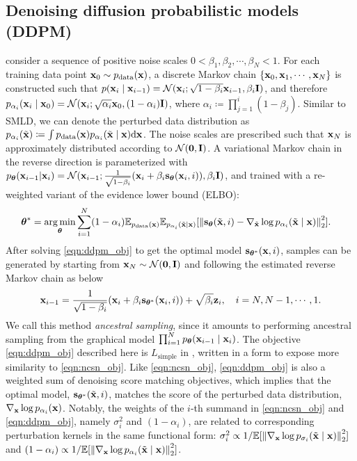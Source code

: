 \subsection{Denoising diffusion probabilistic models (DDPM)}\label{sec:ddpm}
\citet{sohl2015deep,ho2020denoising} consider a sequence of positive noise scales $0 < \beta_1, \beta_2, \cdots, \beta_N < 1$. For each training data point $\mathbf{x}_0 \sim p_{\mathrm{data}}(\mathbf{x})$, a discrete Markov chain $\{ \mathbf{x}_0, \mathbf{x}_1, \cdots, \mathbf{x}_N \}$ is constructed such that $p(\mathbf{x}_{i} \mid \mathbf{x}_{i-1}) = \mathcal{N}(\mathbf{x}_{i} ; \sqrt{1-\beta_i} \mathbf{x}_{i-1}, \beta_i \mathbf{I})$, and therefore $p_{\alpha_i}(\mathbf{x}_i \mid \mathbf{x}_0) = \mathcal{N}(\mathbf{x}_i ;\sqrt{\alpha_i} \mathbf{x}_0, (1-\alpha_i)\mathbf{I})$, where $\alpha_i \coloneqq \prod_{j=1}^i (1-\beta_j)$. Similar to SMLD, we can denote the perturbed data distribution as $p_{\alpha_i}(\tilde{\mathbf{x}}) \coloneqq \int p_\text{data}(\mathbf{x}) p_{\alpha_i}(\tilde{\mathbf{x}} \mid \mathbf{x}) \mathrm{d} \mathbf{x}$. The noise scales are prescribed such that %
$\mathbf{x}_N$ is approximately distributed according to $\mathcal{N}(\mathbf{0}, \mathbf{I})$. A variational Markov chain in the reverse direction is parameterized with $p_{\boldsymbol{\theta}}(\mathbf{x}_{i-1} | \mathbf{x}_{i}) = \mathcal{N}(\mathbf{x}_{i-1}; \frac{1}{\sqrt{1-\beta_i}} (\mathbf{x}_i + \beta_i \mathbf{s}_{\boldsymbol{\theta}}(\mathbf{x}_i, i)), \beta_i \mathbf{I})$, and trained with a re-weighted variant of the evidence lower bound (ELBO):
\begin{align}
{\boldsymbol{\theta}}^* &= \operatorname*{arg\,min}_{\boldsymbol{\theta}}
    \sum_{i=1}^{N} (1-\alpha_i) \mathbb{E}_{p_{\mathrm{data}}(\mathbf{x})}\mathbb{E}_{p_{\alpha_i}(\tilde{\mathbf{x}} \mid \mathbf{x})}[\left\lVert \mathbf{s}_{\boldsymbol{\theta}}(\tilde{\mathbf{x}}, i) - \nabla_{\tilde{\mathbf{x}}} \log p_{\alpha_i}(\tilde{\mathbf{x}} \mid \mathbf{x})\right\rVert_2^2]. \label{eqn:ddpm_obj}
\end{align}
After solving \cref{eqn:ddpm_obj} to get the optimal model $\mathbf{s}_{{\boldsymbol{\theta}}^*}(\mathbf{x}, i)$, samples can be generated by starting from $\mathbf{x}_N \sim \mathcal{N}(\mathbf{0}, \mathbf{I})$ and following the estimated reverse Markov chain as below
\begin{align}
    \mathbf{x}_{i-1} = \frac{1}{\sqrt{1-\beta_i}} (\mathbf{x}_i + \beta_i \mathbf{s}_{{\boldsymbol{\theta}}^*}(\mathbf{x}_i, i)) + \sqrt{\beta_i}\mathbf{z}_i, \quad i=N, N-1, \cdots, 1. \label{eqn:ddpm_sampling}
\end{align}
We call this method \emph{ancestral sampling}, since it amounts to performing ancestral sampling from the graphical model $\prod_{i=1}^N p_{\boldsymbol{\theta}}(\mathbf{x}_{i-1} \mid \mathbf{x}_i)$. The objective \cref{eqn:ddpm_obj} described here is $L_{\text{simple}}$ in \citet{ho2020denoising}, written in a form to expose more similarity to \cref{eqn:ncsn_obj}. 
Like \cref{eqn:ncsn_obj}, \cref{eqn:ddpm_obj} is also a weighted sum of denoising score matching objectives, which implies that the optimal model, $\mathbf{s}_{{\boldsymbol{\theta}}^*}(\tilde{\mathbf{x}}, i)$, matches the score of the perturbed data distribution, $\nabla_{\mathbf{x}} \log p_{\alpha_i}(\mathbf{x})$. Notably, the weights of the $i$-th summand in \cref{eqn:ncsn_obj} and \cref{eqn:ddpm_obj}, namely $\sigma_i^2$ and $(1-\alpha_i)$, are related to corresponding perturbation kernels in the same functional form: $\sigma_i^2 \propto 1/\mathbb{E}[\left\lVert\nabla_{\mathbf{x}} \log p_{\sigma_i}(\tilde{\mathbf{x}} \mid \mathbf{x})\right\rVert_2^2]$ and $(1-\alpha_i) \propto 1/\mathbb{E}[\left\lVert\nabla_{\mathbf{x}} \log p_{\alpha_i}(\tilde{\mathbf{x}} \mid \mathbf{x})\right\rVert_2^2]$. %

